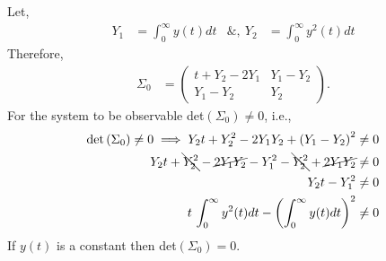 Let, 
\begin{align*}
    Y_1 &= \int_{0}^{\infty} y(t) dt & \&,\ Y_2 &= \int_{0}^{\infty} y^2(t) dt
\end{align*}
Therefore, 
\begin{align*}
    \Sigma_0 &= \begin{pmatrix} t + Y_2 - 2Y_1 & Y_1 - Y_2\\ Y_1 - Y_2 & Y_2 \end{pmatrix}.
\end{align*}
For the system to be observable det$\left(\Sigma_0\right) \neq 0$, i.e., 
\begin{align*}
    \text{det}\left(\Sigma_0\right) \neq 0 \implies Y_2t + Y_2^2 - 2Y_1Y_2 + \left(Y_1 - Y_2\right)^2 &\neq 0 \\
    Y_2t + \bcancel{Y_2^2} - \cancel{2Y_1Y_2} - Y_1^2 - \bcancel{Y_2^2} + \cancel{2Y_1Y_2} &\neq 0 \\
    Y_2t - Y_1^2 &\neq 0 \\
    t\,\int_{0}^{\infty} y^2(t) dt - \left(\int_{0}^{\infty} y(t) dt\right)^2 &\neq 0 
\end{align*}
If $y(t)$ is a constant then det$\left(\Sigma_0\right) = 0$.

